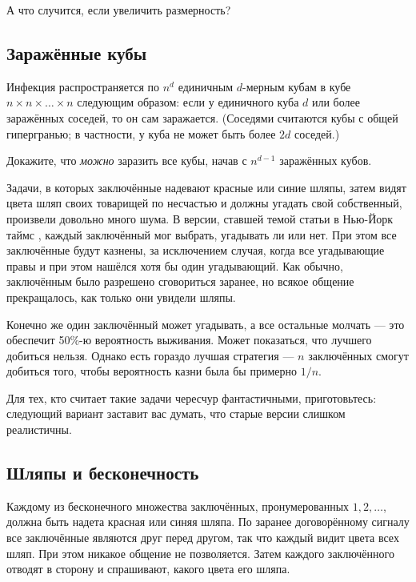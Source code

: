 А что случится, если увеличить размерность?

\subsection*{Заражённые кубы}

Инфекция распространяется по $n^d$ единичным $d$-мерным кубам в кубе $n \times n \times \dots \times n$ следующим образом: если у единичного куба $d$ или более заражённых соседей, то он сам заражается.
(Соседями считаются кубы с общей гипергранью; в частности, у куба не может быть более $2d$ соседей.)

Докажите, что \emph{можно} заразить все кубы, начав с $n^{d-1}$ заражённых кубов.

\medskip

Задачи, в которых заключённые надевают красные или синие шляпы, затем видят цвета шляп своих товарищей по несчастью и должны угадать свой собственный, произвели довольно много шума.
В версии, ставшей темой статьи в Нью-Йорк таймс \cite{50}, каждый заключённый мог выбрать, угадывать ли или нет.
При этом все заключённые будут казнены, за исключением случая, когда все угадывающие правы и при этом нашёлся хотя бы один угадывающий.
Как обычно, заключённым было разрешено сговориться заранее, но всякое общение прекращалось, как только они увидели шляпы.

Конечно же один заключённый может угадывать, а все остальные молчать --- 
это обеспечит 50\%-ю вероятность выживания. 
Может показаться, что лучшего добиться нельзя.
Однако есть гораздо лучшая стратегия --- $n$ заключённых смогут добиться того, чтобы вероятность казни была бы примерно $1/n$.

Для тех, кто считает такие задачи чересчур фантастичными, приготовьтесь:
следующий вариант заставит вас думать, что старые версии слишком реалистичны.

\subsection*{Шляпы и бесконечность}\label{Шляпы и бесконечность}

Каждому из бесконечного множества заключённых, пронумерованных $1,2,\dots$, должна быть надета красная или синяя шляпа.
По заранее договорённому сигналу все заключённые являются друг перед другом, так что каждый видит цвета всех шляп.
При этом никакое общение не позволяется.
Затем каждого заключённого отводят в сторону и спрашивают, какого цвета его шляпа.

